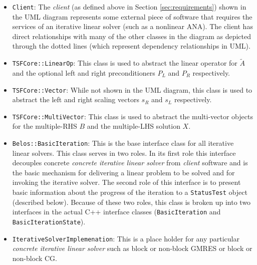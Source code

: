 \documentclass[pdf,ps2pdf,11pt]{SANDreport}
\begin{document}
\begin{itemize}

\item{}\texttt{Client}:
The {}\textit{client} (as defined above in Section
{}\ref{sec:requirements}) shown in the UML diagram represents some
external piece of software that requires the services of an iterative
linear solver (such as a nonlinear ANA).  The client has direct
relationships with many of the other classes in the diagram as
depicted through the dotted lines (which represent dependency
relationships in UML).

\item{}\texttt{TSFCore::LinearOp}:
This class is used to abstract the linear operator for $\tilde{A}$ and
the optional left and right preconditioners $P_L$ and $P_R$
respectively.

\item{}\texttt{TSFCore::Vector}:
While not shown in the UML diagram, this class is used to abstract the
left and right scaling vectors $s_R$ and $s_L$ respectively.

\item{}\texttt{TSFCore::MultiVector}:
This class is used to abstract the multi-vector objects for the
multiple-RHS $B$ and the multiple-LHS solution $X$.

\item{}\texttt{Belos::BasicIteration}:
This is the base interface class for all iterative linear solvers.
This class serves in two roles.  In its first role this interface
decouples concrete {}\textit{concrete iterative linear solver} from
{}\textit{client} software and is the basic mechanism for delivering a
linear problem to be solved and for invoking the iterative solver.
The second role of this interface is to present basic information
about the progress of the iteration to a {}\texttt{Status\-Test}
object (described below).  Because of these two roles, this class is
broken up into two interfaces in the actual C++ interface classes
({}\texttt{Basic\-Iteration} and {}\texttt{Basic\-Iteration\-State}).

\item{}\texttt{IterativeSolverImplemenation}:
This is a place holder for any particular {}\textit{concrete iterative
linear solver} such as block or non-block GMRES or block or non-block
CG.


\end{itemize}
\end{document}
